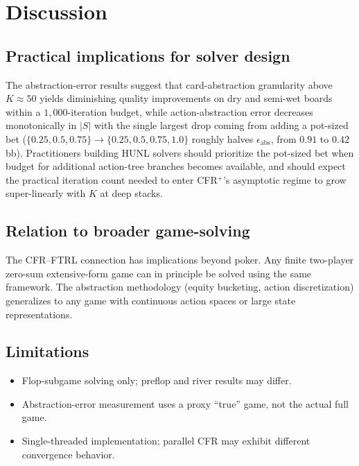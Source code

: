 \section{Discussion}
\label{sec:discussion}

\subsection{Practical implications for solver design}

The abstraction-error results suggest that card-abstraction granularity
above $K\!\approx\!50$ yields diminishing quality improvements on dry
and semi-wet boards within a $1{,}000$-iteration budget, while
action-abstraction error decreases monotonically in $|S|$ with the
single largest drop coming from adding a pot-sized bet ($\{0.25,0.5,0.75\}\!\to\!\{0.25,0.5,0.75,1.0\}$
roughly halves $\epsilon_{\mathrm{abs}}$, from $0.91$ to $0.42$\,bb).
Practitioners building HUNL solvers should prioritize the pot-sized bet
when budget for additional action-tree branches becomes available, and
should expect the practical iteration count needed to enter CFR$^+$'s
asymptotic regime to grow super-linearly with $K$ at deep stacks.

\subsection{Relation to broader game-solving}

The CFR--FTRL connection has implications beyond poker. Any finite
two-player zero-sum extensive-form game can in principle be solved using
the same framework. The abstraction methodology (equity bucketing, action
discretization) generalizes to any game with continuous action spaces or
large state representations.

\subsection{Limitations}

\begin{itemize}
  \item Flop-subgame solving only; preflop and river results may differ.
  \item Abstraction-error measurement uses a proxy ``true'' game, not the
        actual full game.
  \item Single-threaded implementation; parallel CFR may exhibit different
        convergence behavior.
\end{itemize}
